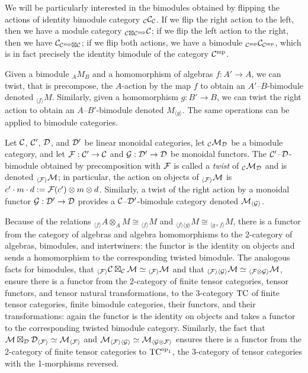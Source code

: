 \documentclass{amsart}
\begin{document}
\noindent We will be particularly interested in the bimodules obtained by flipping the actions of identity bimodule category ${}_\mathcal C \mathcal C_\mathcal C$.  If we flip the right action to the left, then we have a module category ${}_{\mathcal C \boxtimes \mathcal C^{\mathrm{mp}}} \mathcal C$; if we flip the left action to the right, then we have $\mathcal C_{\mathcal C^{\mathrm{mp}} \boxtimes \mathcal C}$; if we flip both actions, we have a bimodule ${}_{\mathcal C^{\mathrm{mp}}} \mathcal C_{\mathcal C^{\mathrm{mp}}}$, which is in fact precisely the identity bimodule of the category $\mathcal C^{\mathrm{mp}}$.

Given a bimodule ${}_A M_B$ and a homomorphism of algebras $f: A' \rightarrow A$, we can twist, that is precompose, the $A$-action by the map $f$ to obtain an $A'$--$B$-bimodule denoted ${}_{\langle f \rangle} M$.  Similarly, given a homomorphism $g: B' \rightarrow B$, we can twist the right action to obtain an $A$--$B'$-bimodule denoted $M_{\langle g \rangle}$.  The same operations can be applied to bimodule categories.
\begin{definition}
Let $\mathcal C$, $\mathcal C'$, $\mathcal D$, and $\mathcal D'$ be linear monoidal categories, let ${}_\mathcal C \mathcal M_\mathcal D$ be a bimodule category, and let $\mathcal F: \mathcal C' \rightarrow \mathcal C$ and $\mathcal G: \mathcal D' \rightarrow \mathcal D$ be monoidal functors.  The $\mathcal C'$--$\mathcal D$-bimodule obtained by precomposition with $\mathcal F$ is called a \emph{twist} of ${}_\mathcal C \mathcal M_\mathcal D$ and is denoted ${}_{\langle \mathcal F \rangle} \mathcal M$; in particular, the action on objects of ${}_{\langle \mathcal F \rangle} \mathcal M$ is $c' \cdot m \cdot d := \mathcal F(c') \otimes m \otimes d$.  Similarly, a twist of the right action by a monoidal functor $\mathcal G: \mathcal D' \rightarrow \mathcal D$ provides a $\mathcal C$--$\mathcal D'$-bimodule category denoted $\mathcal M_{\langle \mathcal G \rangle}$.
\end{definition}

Because of the relations ${}_{\langle f \rangle} A \otimes_A M \cong {}_{\langle f \rangle} M$ and ${}_{\langle f \rangle \langle g \rangle} M \cong {}_{\langle g \circ f \rangle} M$, there is a functor from the category of algebras and algebra homomorphisms to the 2-category of algebras, bimodules, and intertwiners: the functor is the identity on objects and sends a homomorphism to the corresponding twisted bimodule.  The analogous facts for bimodules, that ${}_{\langle \mathcal F \rangle} \mathcal C \boxtimes_\mathcal C \mathcal M \simeq {}_{\langle \mathcal F \rangle} \mathcal M$ and that ${}_{\langle \mathcal F \rangle \langle \mathcal G \rangle} \mathcal M \simeq {}_{\langle \mathcal F \otimes \mathcal G \rangle} \mathcal M$, ensure there is a functor from the 2-category of finite tensor categories, tensor functors, and tensor natural transformations, to the 3-category $\mathrm{TC}$ of finite tensor categories, finite bimodule categories, their functors, and their transformations: again the functor is the identity on objects and takes a functor to the corresponding twisted bimodule category.  Similarly, the fact that $\mathcal M \boxtimes_\mathcal D \mathcal D_{\langle \mathcal F \rangle} \simeq \mathcal M_{\langle \mathcal F \rangle}$ and $\mathcal M_{\langle \mathcal F \rangle \langle \mathcal G \rangle} \simeq \mathcal M_{\langle \mathcal G \otimes \mathcal F \rangle}$ ensures there is a functor from the 2-category of finite tensor categories to $\mathrm{TC}^{\mathrm{op}_1}$, the 3-category of tensor categories with the 1-morphisms reversed.
\end{document}
